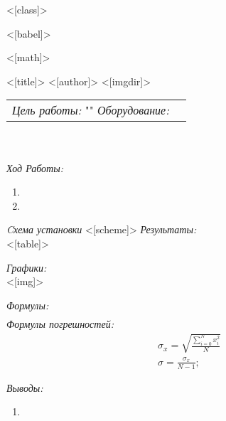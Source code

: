 
<[class]>
\usepackage[utf8]{inputenc}
<[babel]>
\usepackage[OT1]{fontenc}
<[math]>
\usepackage{graphicx}
\usepackage[left=2cm,right=2cm,top=2cm,bottom=2cm]{geometry}

<[title]>
<[author]>
<[imgdir]>

\maketitle

\begin{tabular}{p{12cm} l}
\textit{Цель работы:\newline} "" \newline \newline
\textit{Оборудование:\newline}  
\end{tabular}\\ \\

\textit{Ход Работы:}
\begin{enumerate}
  \item 
  \item 
\end{enumerate}

\textit{Cхема установки}
<[scheme]>
\textit{Результаты:\\}
<[table]>

\textit{Графики:\\}
<[img]>

\textit{Формулы:}
\begin{align*}

\end{align*}
\textit{Формулы погрешностей:}
\begin{align*}
  & \sigma_x = \sqrt{\frac{\sum\limits_{i=0}^{N}x_i^2}{N}} \\
  & \sigma = \frac{\sigma_x}{N-1};%
\end{align*}

\textit{Выводы:\\}
\begin{enumerate}
  \item 
\end{enumerate}
